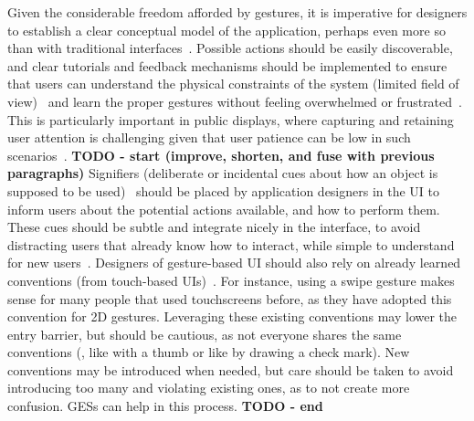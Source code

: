 Given the considerable freedom afforded by gestures, it is imperative for designers to establish a clear conceptual model of the application, perhaps even more so than with traditional interfaces~\cite{Norman:2010}.
%
Possible actions should be easily discoverable, and clear tutorials and feedback mechanisms should be implemented to ensure that users can understand the physical constraints of the system (\eg limited field of view)~\cite{Norman:1999} and learn the proper gestures without feeling overwhelmed or frustrated~\cite{Norman:2010}. 
%
This is particularly important in public displays, where capturing and retaining user attention is challenging given that user patience can be low in such scenarios~\cite{Walter:2013}.
%
\textbf{TODO - start (improve, shorten, and fuse with previous paragraphs)}
Signifiers (\ie deliberate or incidental cues about how an object is supposed to be used)~\cite{Norman:2008} should be placed by application designers in the UI to inform users about the potential actions available, and how to perform them.
%
These cues should be subtle and integrate nicely in the interface, to avoid distracting users that already know how to interact, while simple to understand for new users~\cite{Rovelo:2015,Walter:2013}.
%
Designers of gesture-based UI should also rely on already learned conventions (\eg from touch-based UIs)~\cite{Norman:1999}. For instance, using a swipe gesture makes sense for many people that used touchscreens before, as they have adopted this convention for 2D gestures. Leveraging these existing conventions may lower the entry barrier, but should be cautious, as not everyone shares the same conventions (\eg, like with a thumb or like by drawing a check mark). 
New conventions may be introduced when needed, but care should be taken to avoid introducing too many and violating existing ones, as to not create more confusion. GESs can help in this process.
\textbf{TODO - end}

